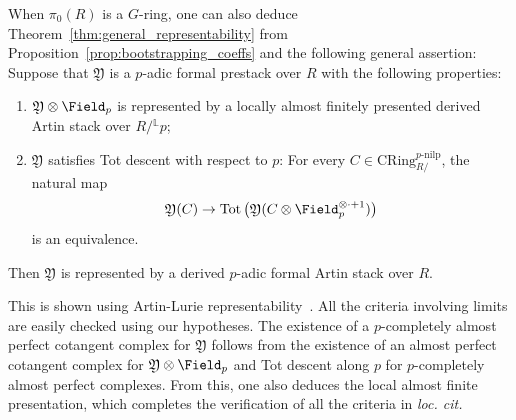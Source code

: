 \documentclass[10pt]{amsart}
\begin{document}
\begin{remark}
\label{rem:artin-lurie_alternative}
When $\pi_0(R)$ is a $G$-ring, one can also deduce Theorem~\ref{thm:general_representability} from Proposition~\ref{prop:bootstrapping_coeffs} and the following general assertion: Suppose that $\mathfrak{Y}$ is a $p$-adic formal prestack over $R$ with the following properties:
\begin{enumerate}
   \item $\mathfrak{Y}\otimes\Field_p$ is represented by a locally almost finitely presented derived Artin stack over $R/{}^{\mathbb{L}}p$;
   \item $\mathfrak{Y}$ satisfies Tot descent with respect to $p$: For every $C\in \mathrm{CRing}^{p\text{-nilp}}_{R/}$, the natural map
   \[
    \mathfrak{Y}(C) \to \mathrm{Tot}\left(\mathfrak{Y}(C\otimes \Field_p^{\otimes \cdot+1})\right)
   \]
   is an equivalence.
\end{enumerate}
Then $\mathfrak{Y}$ is represented by a derived $p$-adic formal Artin stack over $R$. 

This is shown using Artin-Lurie representability~\cite[Theorem 7.1.6]{lurie_thesis}. All the criteria involving limits are easily checked using our hypotheses. The existence of a $p$-completely almost perfect cotangent complex for $\mathfrak{Y}$ follows from the existence of an almost perfect cotangent complex for $\mathfrak{Y}\otimes\Field_p$ and Tot descent along $p$ for $p$-completely almost perfect complexes. From this, one also deduces the local almost finite presentation, which completes the verification of all the criteria in \emph{loc. cit.}
\end{remark} 
\end{document}

